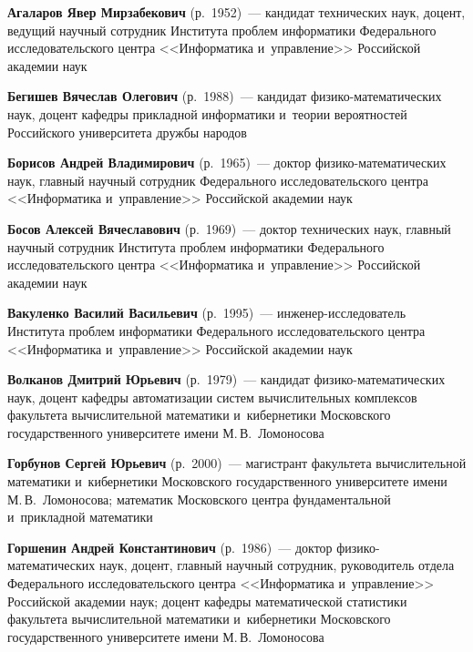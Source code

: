 \begin{multicols}{2}


\noindent
\textbf{Агаларов Явер Мирзабекович} (р.\ 1952)~--- 
кандидат технических наук, доцент, ведущий научный сотрудник Института проб\-лем информатики Федерального исследовательского цент\-ра 
<<Информатика и~управ\-ле\-ние>> Российской академии наук

\noindent
\textbf{Бегишев Вячеслав Олегович} (р.\ 1988)~--- кандидат фи\-зи\-ко-ма\-те\-ма\-ти\-че\-ских наук, 
доцент ка\-фед\-ры при\-клад\-ной информатики и~тео\-рии вероятностей Российского университета друж\-бы народов

\noindent
\textbf{Борисов Андрей Владимирович} (р.\ 1965)~--- доктор фи\-зи\-ко-ма\-те\-ма\-ти\-че\-ских наук, 
главный научный сотрудник Федерального исследовательского цент\-ра <<Информатика и~управ\-ле\-ние>> Российской академии наук

\noindent
\textbf{Босов Алексей Вячеславович} (р.\ 1969)~--- 
доктор технических наук, главный научный сотрудник Института проб\-лем информатики Федерального исследовательского цент\-ра 
<<Информатика и~управ\-ле\-ние>> Российской академии наук

\noindent
\textbf{Вакуленко Василий Васильевич} (р.\ 1995)~--- ин\-же\-нер-ис\-сле\-до\-ва\-тель 
Института проб\-лем информатики Федерального исследовательского цент\-ра <<Информатика и~управ\-ле\-ние>> Российской академии \mbox{наук}

\noindent
\textbf{Волканов Дмитрий Юрьевич} (р.\ 1979)~--- кандидат фи\-зи\-ко-ма\-те\-ма\-ти\-че\-ских наук, 
доцент ка\-фед\-ры автоматизации  сис\-тем вы\-чис\-ли\-тель\-ных комплексов 
факультета вы\-чис\-ли\-тель\-ной математики и~кибернетики
Московского государственного университете имени  М.\,В.~Ломоносова 

\noindent
\textbf{Горбунов Сергей Юрьевич} (р.\ 2000)~--- магистрант факультета
вы\-чис\-ли\-тель\-ной математики и~кибернетики
Московского государственного университете имени  М.\,В.~Ломоносова; математик Московского цент\-ра фундаментальной и~при\-клад\-ной ма\-те\-ма\-тики 

\noindent
\textbf{Горшенин Андрей Константинович} (р.\ 1986)~--- доктор фи\-зи\-ко-ма\-те\-ма\-ти\-че\-ских наук, 
доцент, главный научный сотрудник, руководитель отдела 
Федерального исследовательского цент\-ра <<\mbox{Информатика} и~управ\-ле\-ние>> Российской академии наук;
доцент ка\-фед\-ры математической ста\-ти\-сти\-ки факультета вы\-чис\-ли\-тель\-ной математики и~кибернетики
Московского государственного университете имени  М.\,В.~Ломоносова 


\end{multicols}
